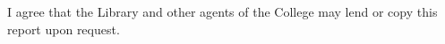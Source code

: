 I agree that the Library and other agents of the College may lend or copy this report upon request.

\sign